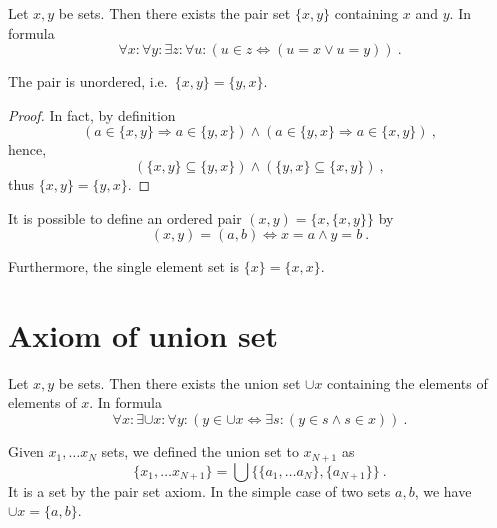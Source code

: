     \begin{axiom}
        Let $x, y$ be sets. Then there exists the pair set $\{x,y\}$ containing $x$ and $y$. In formula
        \begin{equation*}
            \forall x \colon \forall y \colon \exists z \colon \forall u \colon (u \in z \Leftrightarrow (u = x \lor u = y)) ~.
        \end{equation*}
    \end{axiom}

    \begin{theorem}
        The pair is unordered, i.e.~$\{x,y\} = \{y, x\}$.
    \end{theorem}
    \begin{proof}
        In fact, by definition
        \begin{equation*}
            (a \in \{x, y\} \Rightarrow a \in \{y,x\}) \land (a \in \{y, x\} \Rightarrow a \in \{x,y\}) ~,
        \end{equation*}
        hence, 
        \begin{equation*}
            (\{x, y\} \subseteq \{y,x\}) \land (\{y, x\} \subseteq \{x,y\}) ~,
        \end{equation*}
        thus $\{x,y\} = \{y, x\}$.
    \end{proof}

    It is possible to define an ordered pair $(x,y) = \{x, \{x,y\}\}$ by 
    \begin{equation*}
        (x,y) = (a,b) \Leftrightarrow x = a \land y = b ~.
    \end{equation*}

    Furthermore, the single element set is $\{x\} = \{x, x\}$.

\section{Axiom of union set}

    \begin{axiom}
        Let $x, y$ be sets. Then there exists the union set $\cup x$ containing the elements of elements of $x$. In formula
        \begin{equation*}
            \forall x \colon \exists \cup x \colon \forall y \colon (y \in \cup x \Leftrightarrow \exists s \colon (y \in s \land s \in x)) ~.
        \end{equation*}
    \end{axiom}

    Given $x_1, \ldots x_N$ sets, we defined the union set to $x_{N+1}$ as 
    \begin{equation*}
        \{x_1, \ldots x_{N+1}\} = \bigcup \{\{a_1, \ldots a_N\},\{a_{N+1}\}\} ~.
    \end{equation*}
    It is a set by the pair set axiom. In the simple case of two sets $a, b$, we have $\cup x = \{a,b\}$.

